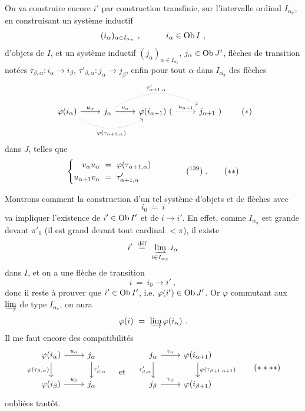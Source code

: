 On va construire encore $i'$ par construction transfinie, sur l'intervalle ordinal $I_{\alpha_\pi}$, en construisant un système inductif
\[
(i_\alpha)_{\alpha\in I_{\alpha_\pi}} \ , \qquad\quad i_\alpha \in \operatorname{Ob} I \ ,
\]
d'objets de $I$, et un système inductif $(j_\alpha)_{\alpha\in I_{\alpha_\pi}}$, $j_\alpha \in \operatorname{Ob} J'$, flèches de transition notées $\tau_{\beta,\alpha} : i_\alpha \longrightarrow i_\beta$, $\tau'_{\beta,\alpha} : j_\alpha \longrightarrow j_\beta$, enfin pour tout $\alpha$ dans $I_{\alpha_\pi}$ des flèches
\[
\begin{tikzcd}
\varphi(i_\alpha) \arrow[r, "u_\alpha"] \arrow[rr, dotted, bend right, "\varphi(\tau_{\alpha+1,\alpha})"'] & j_\alpha \arrow[r, "v_\alpha"] \arrow[rr, dotted, bend left, "\tau'_{\alpha+1,\alpha}"] & \varphi(i_{\alpha+1})\ ( \arrow[r, dotted, "u_{\alpha+1}"] & j_{\alpha+1}\ )
\end{tikzcd}
\tag*{$(*)$}
\]
dans $J$, telles que
\[
\left\{
\begin{aligned}
v_\alpha u_\alpha \ &= \ \varphi(\tau_{\alpha+1,\alpha}) \\
u_{\alpha+1} v_\alpha \ &= \ \tau'_{\alpha+1,\alpha}
\end{aligned}
\right.
\qquad\qquad \text{(\footnotemark[139])} \ .
\tag*{$(**)$}
\]

\noindent Montrons comment la construction d'un tel système d'objets et de flèches avec
\[
i_0 \ = \ i \tag*{$(***)$}
\]
va impliquer l'existence de $i' \in \operatorname{Ob} I'$ et de $i \longrightarrow i'$. En effet, comme $I_{\alpha_\pi}$ est grande devant $\pi'_0$ (il est grand devant tout cardinal $< \pi$), il existe
\[
i' \ \overset{\text{déf}}{=} \ \varinjlim_{i\in I_{\alpha_\pi}} i_\alpha %
\]
dans $I$, et on a une flèche de transition
\[
i \ = \ i_0 \longrightarrow i' \ ,
\]
donc il reste à prouver que $i' \in \operatorname{Ob} I'$, i.e. $\varphi(i') \in \operatorname{Ob} J'$. Or $\varphi$ commutant aux $\varinjlim$ de type $I_{\alpha_\pi}$, on aura
\[
\varphi(i) \ = \ \varinjlim \varphi(i_\alpha) \ .
\]
Il me faut encore des compatibilités
\[
\begin{tikzcd}
\varphi(i_\alpha) \arrow[r, "u_\alpha"] \arrow[d, "\varphi(\tau_{\beta,\alpha})"'] & j_\alpha \arrow[d, "\tau'_{\beta,\alpha}"] & {} \arrow[d, phantom, "\text{et}" description] & j_\alpha \arrow[r, "v_\alpha"] \arrow[d, "\tau'_{\beta,\alpha}"'] & \varphi(i_{\alpha+1}) \arrow[d, "\varphi(\tau_{\beta+1,\alpha+1})"] \\
\varphi(i_\beta) \arrow[r, "u_\beta"] & j_\alpha & {} & j_\beta \arrow[r, "v_\beta"] & \varphi(i_{\beta+1})
\end{tikzcd}
\tag*{$(****)$} %
\]
oubliées tantôt.

